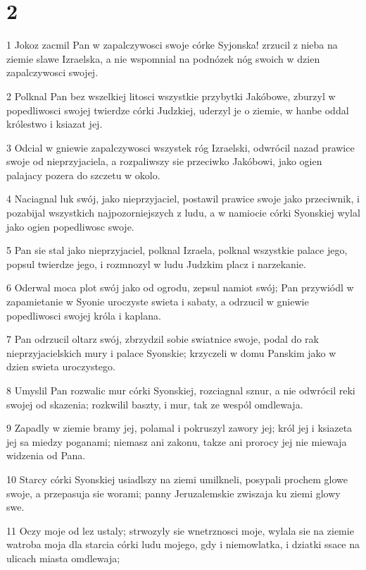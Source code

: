 \chapter{2}

\par 1 Jokoz zacmil Pan w zapalczywosci swoje córke Syjonska! zrzucil z nieba na ziemie slawe Izraelska, a nie wspomnial na podnózek nóg swoich w dzien zapalczywosci swojej.
\par 2 Polknal Pan bez wszelkiej litosci wszystkie przybytki Jakóbowe, zburzyl w popedliwosci swojej twierdze córki Judzkiej, uderzyl je o ziemie, w hanbe oddal królestwo i ksiazat jej.
\par 3 Odcial w gniewie zapalczywosci wszystek róg Izraelski, odwrócil nazad prawice swoje od nieprzyjaciela, a rozpaliwszy sie przeciwko Jakóbowi, jako ogien palajacy pozera do szczetu w okolo.
\par 4 Naciagnal luk swój, jako nieprzyjaciel, postawil prawice swoje jako przeciwnik, i pozabijal wszystkich najpozorniejszych z ludu, a w namiocie córki Syonskiej wylal jako ogien popedliwosc swoje.
\par 5 Pan sie stal jako nieprzyjaciel, polknal Izraela, polknal wszystkie palace jego, popsul twierdze jego, i rozmnozyl w ludu Judzkim placz i narzekanie.
\par 6 Oderwal moca plot swój jako od ogrodu, zepsul namiot swój; Pan przywiódl w zapamietanie w Syonie uroczyste swieta i sabaty, a odrzucil w gniewie popedliwosci swojej króla i kaplana.
\par 7 Pan odrzucil oltarz swój, zbrzydzil sobie swiatnice swoje, podal do rak nieprzyjacielskich mury i palace Syonskie; krzyczeli w domu Panskim jako w dzien swieta uroczystego.
\par 8 Umyslil Pan rozwalic mur córki Syonskiej, rozciagnal sznur, a nie odwrócil reki swojej od skazenia; rozkwilil baszty, i mur, tak ze wespól omdlewaja.
\par 9 Zapadly w ziemie bramy jej, polamal i pokruszyl zawory jej; król jej i ksiazeta jej sa miedzy poganami; niemasz ani zakonu, takze ani prorocy jej nie miewaja widzenia od Pana.
\par 10 Starcy córki Syonskiej usiadlszy na ziemi umilkneli, posypali prochem glowe swoje, a przepasuja sie worami; panny Jeruzalemskie zwiszaja ku ziemi glowy swe.
\par 11 Oczy moje od lez ustaly; strwozyly sie wnetrznosci moje, wylala sie na ziemie watroba moja dla starcia córki ludu mojego, gdy i niemowlatka, i dziatki ssace na ulicach miasta omdlewaja;
